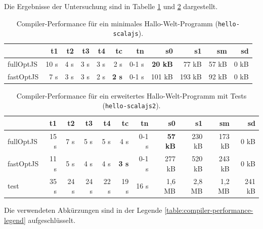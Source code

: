 \documentclass[a4paper, 12pt, hidelinks, listof=totoc, listoftables=totoc, bibliography=totoc]{scrreprt}
\begin{document}
Die Ergebnisse der Untersuchung sind in Tabelle \ref{table:compiler-performance1} und \ref{table:compiler-performance2} dargestellt.

\medskip

\begin{table}[!h]
\begin{tabular}{|l|r|r|r|r|r|r||r|r|r|r|}
\hline           & t1   & t2   & t3   & t4   & tc            & tn    & s0             & s1     & sm    & sd    \\ 
\hline fullOptJS & 10 s &  4 s &  3 s &  3 s &          2 s  & 0-1 s & \textbf{20 kB} &  77 kB & 57 kB &  0 kB \\ 
\hline fastOptJS &  7 s &  3 s &  3 s &  2 s &  \textbf{2 s} & 0-1 s &        101 kB  & 193 kB & 92 kB &  0 kB \\ 
\hline 
\end{tabular} 
\caption{Compiler-Performance für ein minimales Hallo-Welt-Programm (\texttt{hello-scalajs}).}
\label{table:compiler-performance1}
\end{table}

\medskip

\begin{table}[!h]
\begin{tabular}{|l|r|r|r|r|r|r||r|r|r|r|}
\hline           & t1   & t2   & t3   & t4   & tc            & tn    & s0             & s1     & sm     & sd     \\ 
\hline fullOptJS & 15 s &  7 s &  5 s &  5 s &          4 s  & 0-1 s & \textbf{57 kB} & 230 kB & 173 kB &   0 kB \\ 
\hline fastOptJS & 11 s &  5 s &  4 s &  4 s &  \textbf{3 s} & 0-1 s &        277 kB  & 520 kB & 243 kB &   0 kB \\ 
\hline test      & 35 s & 24 s & 24 s & 22 s &         19 s  &  16 s &        1,6 MB  & 2,8 MB & 1,2 MB & 241 kB \\ 
\hline 
\end{tabular} 
\caption{Compiler-Performance für ein erweitertes Hallo-Welt-Programm mit Tests (\texttt{hello-scalajs2}).}
\label{table:compiler-performance2}
\end{table}

\medskip

Die verwendeten Abkürzungen sind in der Legende \ref{table:compiler-performance-legend} aufgeschlüsselt.

\medskip
\end{document}
